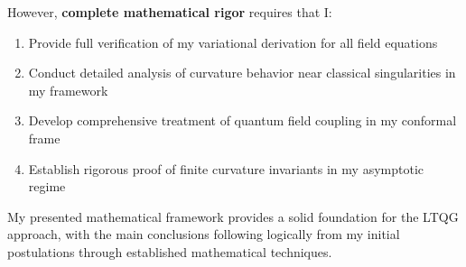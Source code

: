 \documentclass[11pt,a4paper]{article}
\begin{document}
However, \textbf{complete mathematical rigor} requires that I:
\begin{enumerate}
\item Provide full verification of my variational derivation for all field equations
\item Conduct detailed analysis of curvature behavior near classical singularities in my framework
\item Develop comprehensive treatment of quantum field coupling in my conformal frame
\item Establish rigorous proof of finite curvature invariants in my asymptotic regime
\end{enumerate}

My presented mathematical framework provides a solid foundation for the LTQG approach, with the main conclusions following logically from my initial postulations through established mathematical techniques.
\end{document}
